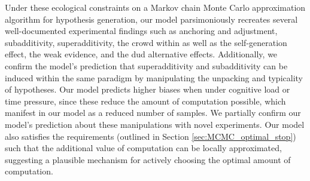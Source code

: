 Under these ecological constraints on a Markov chain Monte Carlo approximation algorithm for hypothesis generation, our model parsimoniously recreates several well-documented experimental findings such as anchoring and adjustment, subadditivity, superadditivity, the crowd within as well as the self-generation effect, the weak evidence, and the dud alternative effects. Additionally, we confirm the model’s prediction that superadditivity and subadditivity can be induced within the same paradigm by manipulating the unpacking and typicality of hypotheses. Our model predicts higher biases when under cognitive load or time pressure, since these reduce the amount of computation possible, which manifest in our model as a reduced number of samples. We partially confirm our model’s prediction about these manipulations with novel experiments. Our model also satisfies the requirements (outlined in Section \ref{sec:MCMC_optimal_stop}) such that the additional value of computation can be locally approximated, suggesting a plausible mechanism for actively choosing the optimal amount of computation.



%
%



